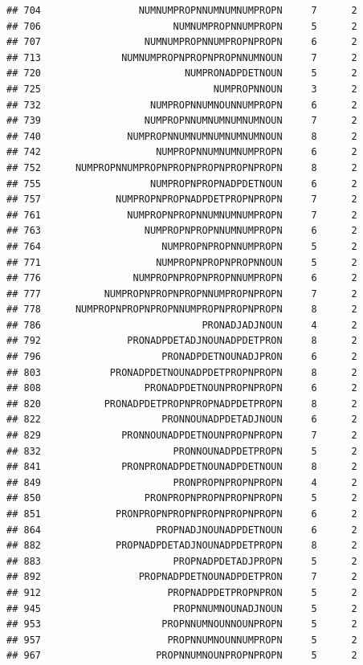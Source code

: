 \documentclass[]{article}
\begin{document}
\begin{verbatim}
## 704                 NUMNUMPROPNNUMNUMNUMPROPN     7      2
## 706                       NUMNUMPROPNNUMPROPN     5      2
## 707                  NUMNUMPROPNNUMPROPNPROPN     6      2
## 713              NUMNUMPROPNPROPNPROPNNUMNOUN     7      2
## 720                         NUMPRONADPDETNOUN     5      2
## 725                              NUMPROPNNOUN     3      2
## 732                   NUMPROPNNUMNOUNNUMPROPN     6      2
## 739                  NUMPROPNNUMNUMNUMNUMNOUN     7      2
## 740               NUMPROPNNUMNUMNUMNUMNUMNOUN     8      2
## 742                    NUMPROPNNUMNUMNUMPROPN     6      2
## 752      NUMPROPNNUMPROPNPROPNPROPNPROPNPROPN     8      2
## 755                   NUMPROPNPROPNADPDETNOUN     6      2
## 757             NUMPROPNPROPNADPDETPROPNPROPN     7      2
## 761               NUMPROPNPROPNNUMNUMNUMPROPN     7      2
## 763                  NUMPROPNPROPNNUMNUMPROPN     6      2
## 764                     NUMPROPNPROPNNUMPROPN     5      2
## 771                    NUMPROPNPROPNPROPNNOUN     5      2
## 776                NUMPROPNPROPNPROPNNUMPROPN     6      2
## 777           NUMPROPNPROPNPROPNNUMPROPNPROPN     7      2
## 778      NUMPROPNPROPNPROPNNUMPROPNPROPNPROPN     8      2
## 786                            PRONADJADJNOUN     4      2
## 792               PRONADPDETADJNOUNADPDETPRON     8      2
## 796                     PRONADPDETNOUNADJPRON     6      2
## 803            PRONADPDETNOUNADPDETPROPNPROPN     8      2
## 808                  PRONADPDETNOUNPROPNPROPN     6      2
## 820           PRONADPDETPROPNPROPNADPDETPROPN     8      2
## 822                     PRONNOUNADPDETADJNOUN     6      2
## 829              PRONNOUNADPDETNOUNPROPNPROPN     7      2
## 832                       PRONNOUNADPDETPROPN     5      2
## 841              PRONPRONADPDETNOUNADPDETNOUN     8      2
## 849                       PRONPROPNPROPNPROPN     4      2
## 850                  PRONPROPNPROPNPROPNPROPN     5      2
## 851             PRONPROPNPROPNPROPNPROPNPROPN     6      2
## 864                    PROPNADJNOUNADPDETNOUN     6      2
## 882             PROPNADPDETADJNOUNADPDETPROPN     8      2
## 883                       PROPNADPDETADJPROPN     5      2
## 892                 PROPNADPDETNOUNADPDETPRON     7      2
## 912                      PROPNADPDETPROPNPRON     5      2
## 945                       PROPNNUMNOUNADJNOUN     5      2
## 953                     PROPNNUMNOUNNOUNPROPN     5      2
## 957                      PROPNNUMNOUNNUMPROPN     5      2
## 967                    PROPNNUMNOUNPROPNPROPN     5      2

\end{verbatim}
\end{document}
